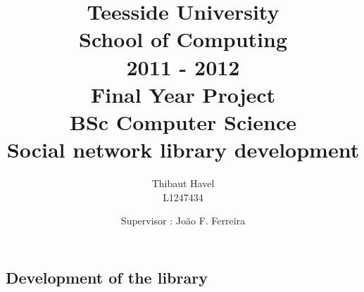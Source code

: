 \documentclass[12pt,a4paper,utf8x]{report}
\title
{
	\normalsize
	{
		Teesside University\\
		School of Computing\\
		2011 - 2012\\
	}
	\vspace{45mm}
	\textbf{Final Year Project}\\
	\normalsize{BSc Computer Science}\\
	\vspace{10mm}
	\huge{Social network library development}\\
}
\author
{
	Thibaut Havel\\
	\normalsize{L1247434}\\
	\vspace{45mm}
}
\date
{
	\normalsize
	{
		Supervisor : Jo\~{a}o F. Ferreira
	}
}
\begin{document}
\maketitle
\begin{onehalfspace}


\tableofcontents
\part{Development of the library}









\end{onehalfspace}
\printindex
\end{document}
